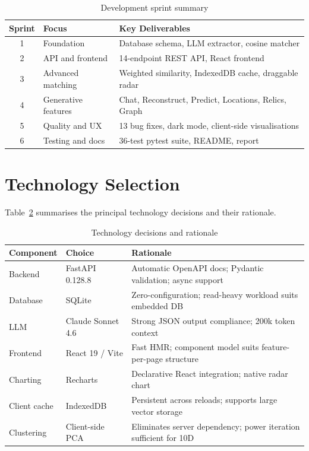 \documentclass[11pt, a4paper]{report}
\begin{document}
\begin{table}[H]
  \centering
  \caption{Development sprint summary}
  \label{tab:sprints}
  \begin{tabular}{clp{6cm}}
    \toprule
    Sprint & Focus & Key Deliverables \\
    \midrule
    1 & Foundation & Database schema, LLM extractor, cosine matcher \\
    2 & API and frontend & 14-endpoint REST API, React frontend \\
    3 & Advanced matching & Weighted similarity, IndexedDB cache, draggable radar \\
    4 & Generative features & Chat, Reconstruct, Predict, Locations, Relics, Graph \\
    5 & Quality and UX & 13 bug fixes, dark mode, client-side visualisations \\
    6 & Testing and docs & 36-test pytest suite, README, report \\
    \bottomrule
  \end{tabular}
\end{table}

\section{Technology Selection}

Table~\ref{tab:tech} summarises the principal technology decisions and their rationale.

\begin{table}[H]
  \centering
  \caption{Technology decisions and rationale}
  \label{tab:tech}
  \begin{tabular}{lp{3.5cm}p{5.5cm}}
    \toprule
    Component & Choice & Rationale \\
    \midrule
    Backend & FastAPI 0.128.8 & Automatic OpenAPI docs; Pydantic validation; async support \\
    Database & SQLite & Zero-configuration; read-heavy workload suits embedded DB \\
    LLM & Claude Sonnet 4.6 & Strong JSON output compliance; 200k token context \\
    Frontend & React 19 / Vite & Fast HMR; component model suits feature-per-page structure \\
    Charting & Recharts & Declarative React integration; native radar chart \\
    Client cache & IndexedDB & Persistent across reloads; supports large vector storage \\
    Clustering & Client-side PCA & Eliminates server dependency; power iteration sufficient for 10D \\
    \bottomrule
  \end{tabular}
\end{table}
\end{document}
